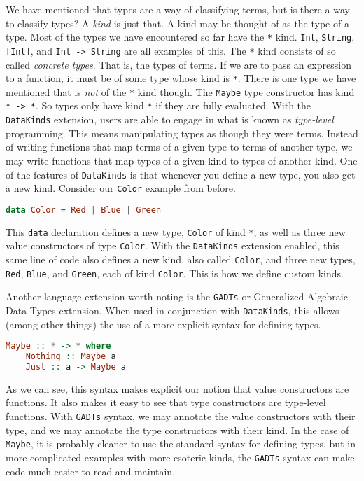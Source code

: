\documentclass[MS, xcolor=dvipsnames]{wfuthesis}
\theoremstyle{definition}
\begin{document}
We have mentioned that types are a way of classifying terms, but is there a way to classify types? A \emph{kind} is just that. A kind may be thought of as the type of a type. Most of the types we have encountered so far have the \lstinline{*} kind. \lstinline{Int}, \lstinline{String}, \lstinline{[Int]}, and \lstinline{Int -> String} are all examples of this. The \lstinline{*} kind consists of so called \emph{concrete types}. That is, the types of terms. If we are to pass an expression to a function, it must be of some type whose kind is \lstinline{*}. There is one type we have mentioned that is \emph{not} of the \lstinline{*} kind though. The \lstinline{Maybe} type constructor has kind \lstinline{* -> *}. So types only have kind \lstinline{*} if they are fully evaluated. With the \lstinline{DataKinds} extension, users are able to engage in what is known as \emph{type-level} programming. This means manipulating types as though they were terms. Instead of writing functions that map terms of a given type to terms of another type, we may write functions that map types of a given kind to types of another kind. One of the features of \lstinline{DataKinds} is that whenever you define a new type, you also get a new kind. Consider our \lstinline{Color} example from before.
\begin{lstlisting}[language=Haskell]
data Color = Red | Blue | Green
\end{lstlisting}
This \lstinline{data} declaration defines a new type, \lstinline{Color} of kind \lstinline{*}, as well as three new value constructors of type \lstinline{Color}. With the \lstinline{DataKinds} extension enabled, this same line of code also defines a new kind, also called \lstinline{Color}, and three new types, \lstinline{Red}, \lstinline{Blue}, and \lstinline{Green}, each of kind \lstinline{Color}. This is how we define custom kinds. \par
Another language extension worth noting is the \lstinline{GADTs} or Generalized Algebraic Data Types extension. When used in conjunction with \lstinline{DataKinds}, this allows (among other things) the use of a more explicit syntax for defining types.
\begin{lstlisting}[language=Haskell]
Maybe :: * -> * where
    Nothing :: Maybe a
    Just :: a -> Maybe a
\end{lstlisting}
As we can see, this syntax makes explicit our notion that value constructors are functions. It also makes it easy to see that type constructors are type-level functions. With \lstinline{GADTs} syntax, we may annotate the value constructors with their type, and we may annotate the type constructors with their kind. In the case of \lstinline{Maybe}, it is probably cleaner to use the standard syntax for defining types, but in more complicated examples with more esoteric kinds, the \lstinline{GADTs} syntax can make code much easier to read and maintain. \par
\end{document}
